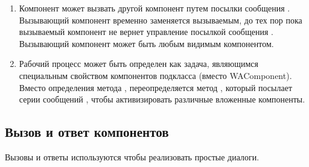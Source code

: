 \documentclass[a4paper,10pt,twoside]{book}
\begin{document}

\begin{enumerate}
\item Компонент может вызвать другой компонент путем посылки сообщения
.
Вызывающий компонент временно заменяется вызываемым,
до тех пор пока вызываемый компонент не вернет управление посылкой
сообщения .
Вызывающий компонент может быть любым видимым компонентом.

\item Рабочий процесс может быть определен как задача,
являющимся специальным свойством компонентов подкласса 
(вместо WAComponent).
Вместо определения метода , переопределяется метод
, который посылает серии сообщений ,
чтобы активизировать различные вложенные компоненты.

\end{enumerate}


\subsection{Вызов и ответ компонентов}


Вызовы и ответы используются чтобы реализовать простые диалоги.
\end{document}
